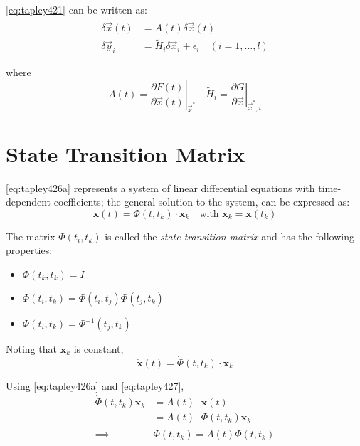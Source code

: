 \ref{eq:tapley421} can be written as:
\begin{align}
  \label{eq:tapley426a}
  \delta \dot{\vec{x}}(t) &= A(t) \delta \vec{x}(t) \\
  \label{eq:tapley426b}
  \delta \vec{y}_i &= \tilde{H}_i \delta \vec{x}_i + {\epsilon}_i \quad (i=1,\ldots,l)
\end{align}

where
\begin{equation}
A(t) = \left.\frac{\partial F(t)}{\partial \vec{x} (t)}\right|_{\vec{x}^*} 
\quad
\tilde{H}_i = \left.\frac{\partial G}{\partial \vec{x}}\right|_{\vec{x}^* , i}
\end{equation}

\section{State Transition Matrix}
\ref{eq:tapley426a} represents a system of linear differential equations with time-dependent 
coefficients; the general solution to the system, can be expressed as:
\begin{equation}
\label{eq:tapley427}
  \bm{x}(t) = \Phi (t, t_k) \cdot \bm{x}_k \quad \text{with } \bm{x}_k = \bm{x}(t_k)
\end{equation}

The matrix \(\Phi (t_i, t_k) \) is called the \emph{state transition matrix} and has the 
following properties:
\begin{itemize}
  \item \(\Phi (t_k, t_k) = I \)
  \item \(\Phi (t_i, t_k) = \Phi (t_i, t_j) \Phi (t_j, t_k) \)
  \item \(\Phi (t_i, t_k) = {\Phi}^{-1} (t_j, t_k) \)
\end{itemize}

Noting that \(\bm{x}_k\) is constant,
\begin{equation}
  \label{eq:tapley429}
  \bm{\dot{x}}(t) = \dot{\Phi} (t, t_k) \cdot \bm{x}_k
\end{equation}

Using \ref{eq:tapley426a} and \ref{eq:tapley427},
\begin{equation}
  \label{eq:tapley4210}
  \begin{aligned}
  \dot{\Phi} (t, t_k) \bm{x}_k & = A(t) \cdot \bm{x} (t) \\
  & = A(t) \cdot \Phi (t, t_k) \bm{x}_k \\ 
  \implies & \dot{\Phi} (t, t_k) = A(t) \Phi (t, t_k)
  \end{aligned}
\end{equation}

